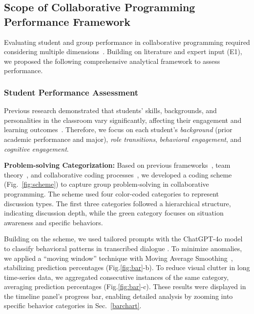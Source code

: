 \subsection{Scope of Collaborative Programming Performance Framework}
Evaluating student and group performance in collaborative programming required considering multiple dimensions~\cite{hawlitschek2023empirical}.  
Building on literature and expert input (E1), we proposed the following comprehensive analytical framework to assess performance. 



\subsubsection{Student Performance Assessment}
\label{shema}
Previous research demonstrated that students' skills, backgrounds, and personalities in the classroom vary significantly, affecting their engagement and learning outcomes~\cite{wu2019analysing}. 
Therefore, we focus on each student's \textit{background} (prior academic performance and major), \textit{role transitions}, \textit{behavioral engagement}, and \textit{cognitive engagement}.






\textbf{Problem-solving Categorization:}
Based on previous frameworks~\cite{wu2019analysing}, team theory~\cite{zhao2023analysing}, and collaborative coding processes~\cite{sun2021three}, we developed a coding scheme (Fig.~\ref{fig:scheme}) to capture group problem-solving in collaborative programming. 
The scheme used four color-coded categories to represent discussion types. 
The first three categories followed a hierarchical structure, indicating discussion depth, while the green category focuses on situation awareness and specific behaviors.

Building on the scheme, we used tailored prompts with the ChatGPT-4o model~\cite{gpt4o} to classify behavioral patterns in transcribed dialogue . 
To minimize anomalies, we applied a ``moving window'' technique with Moving Average Smoothing~\cite{chang2022muse}, stabilizing prediction percentages (Fig.\ref{fig:bar}-b). To reduce visual clutter in long time-series data, we aggregated consecutive instances of the same category, averaging prediction percentages (Fig.\ref{fig:bar}-c). These results were displayed in the timeline panel's progress bar, enabling detailed analysis by zooming into specific behavior categories in Sec.~\ref{barchart}. 




